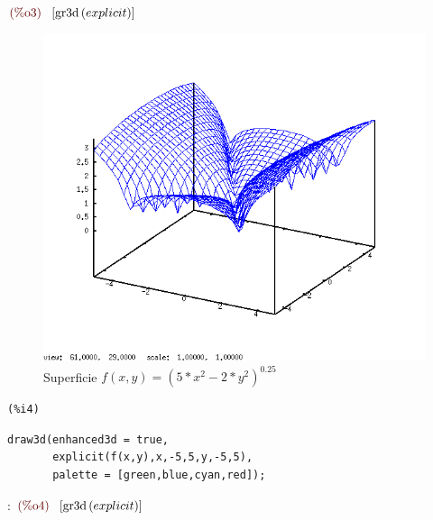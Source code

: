 \documentclass[12pt]{article}
\begin{document}
\begin{math}\displaystyle
\parbox{8ex}{\color{labelcolor}(\%o3) }
[\mathrm{gr3d}\left( explicit\right) ]
\end{math}

\begin{figure}[H]
\centering
\includegraphics[scale=0.5]{3.png}
\caption{Superficie $f(x,y)= (5*x^2-2*y^2)^0.25$ }
\end{figure}

\noindent

\begin{minipage}[t]{8ex}{\color{red}\bf
\begin{verbatim}
(%i4) 
\end{verbatim}}
\end{minipage}
\begin{minipage}[t]{\textwidth}{\color{blue}
\begin{verbatim}
draw3d(enhanced3d = true,
       explicit(f(x,y),x,-5,5,y,-5,5),
       palette = [green,blue,cyan,red]);
\end{verbatim}}
\end{minipage}
:
\begin{math}\displaystyle
\parbox{8ex}{\color{labelcolor}(\%o4) }
[\mathrm{gr3d}\left( explicit\right) ]
\end{math}
\end{document}
